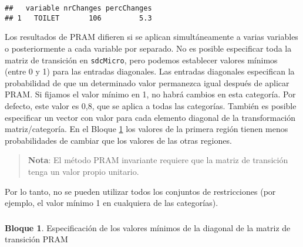 \documentclass[
]{book}
\newenvironment{Shaded}{\begin{snugshade}}{\end{snugshade}}
\newcommand{\AttributeTok}[1]{\textcolor[rgb]{0.77,0.63,0.00}{#1}}
\newcommand{\CommentTok}[1]{\textcolor[rgb]{0.56,0.35,0.01}{\textit{#1}}}
\newcommand{\DecValTok}[1]{\textcolor[rgb]{0.00,0.00,0.81}{#1}}
\newcommand{\FunctionTok}[1]{\textcolor[rgb]{0.00,0.00,0.00}{#1}}
\newcommand{\NormalTok}[1]{#1}
\newcommand{\OtherTok}[1]{\textcolor[rgb]{0.56,0.35,0.01}{#1}}
\newcommand{\SpecialCharTok}[1]{\textcolor[rgb]{0.00,0.00,0.00}{#1}}
\newcommand{\StringTok}[1]{\textcolor[rgb]{0.31,0.60,0.02}{#1}}
\theoremstyle{definition}
\theoremstyle{definition}
\newtheorem{example}{Bloque}[chapter]
\theoremstyle{definition}
\theoremstyle{definition}
\theoremstyle{remark}
\begin{document}
\begin{Shaded}
\end{Shaded}

\begin{verbatim}
##   variable nrChanges percChanges
## 1   TOILET       106         5.3
\end{verbatim}

Los resultados de PRAM difieren si se aplican simultáneamente a varias variables o posteriormente a cada variable por separado. No es posible especificar toda la matriz de transición en \texttt{sdcMicro}, pero podemos establecer valores mínimos (entre 0 y 1) para las entradas diagonales. Las entradas diagonales especifican la probabilidad de que un determinado valor permanezca igual después de aplicar PRAM. Si fijamos el valor mínimo en 1, no habrá cambios en esta categoría. Por defecto, este valor es 0,8, que se aplica a todas las categorías. También es posible especificar un vector con valor para cada elemento diagonal de la transformación matriz/categoría. En el Bloque \ref{exm:bloque28jgm} los valores de la primera región tienen menos probabilidades de cambiar que los valores de las otras regiones.

\begin{quote}
\textbf{Nota}: El método PRAM invariante requiere que la matriz de transición tenga un valor propio unitario.
\end{quote}

Por lo tanto, no se pueden utilizar todos los conjuntos de restricciones (por ejemplo, el valor mínimo 1 en cualquiera de las categorías).

\hypertarget{section-2}{%
\subsubsection{}\label{section-2}}

\begin{example}
\protect\hypertarget{exm:bloque28jgm}{}\label{exm:bloque28jgm}Especificación de los valores mínimos de la diagonal de la matriz de transición PRAM
\end{example}
\end{document}
